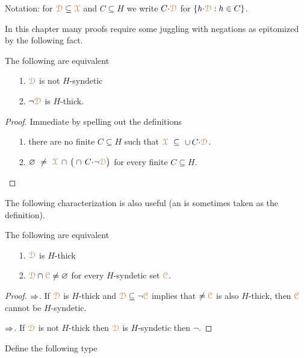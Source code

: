 Notation: for ${\color{brown}\EuScript D}\subseteq{\color{brown}\EuScript X}$ and $C\subseteq H$ we write \emph{$C{\cdot}{\color{brown}\EuScript D}$\/} for $\{h{\cdot}{\color{brown}\EuScript D}: h\in C\}$.

In this chapter many proofs require some juggling with negations as epitomized by the following fact.

\begin{fact}\label{fact_fip}
  The following are equivalent
  \begin{itemize}
    \item[1.] ${\color{brown}\EuScript D}$ is not $H$-syndetic
    \item[2.] $\neg{\color{brown}\EuScript D}$ is $H$-thick.
  \end{itemize}
\end{fact}

\begin{proof}
  Immediate by spelling out the definitions
  \begin{itemize}
    \item[1.] there are no finite $C\subseteq H$ such that ${\color{brown}\EuScript X}\ \subseteq\ \cup\, C{\cdot}{\color{brown}\EuScript D}$.
    \item[2.] $\varnothing\ \neq\ {\color{brown}\EuScript X}\,\cap\,\big(\cap\, C{\cdot}\neg{\color{brown}\EuScript D}\big)$ for every finite $C\subseteq H$.\qedhere
  \end{itemize} 
\end{proof}

The following characterization is also useful (an is sometimes taken as the definition).

\begin{corollary}\label{fact_fip2}
  The following are equivalent
  \begin{itemize}
    \item[1.] ${\color{brown}\EuScript D}$ is $H$-thick
    \item[2.] ${\color{brown}\EuScript D}\cap{\color{brown}\EuScript C}\neq\varnothing$ for every $H$-syndetic set ${\color{brown}\EuScript C}$.
  \end{itemize}
\end{corollary}

\begin{proof}
  $\Rightarrow$. 
  If ${\color{brown}\EuScript D}$ is $H$-thick and ${\color{brown}\EuScript D}\subseteq\neg{\color{brown}\EuScript C}$ implies that $\neq{\color{brown}\EuScript C}$ is also $H$-thick, then ${\color{brown}\EuScript C}$ cannot be $H$-syndetic.

  $\Rightarrow$. 
  If ${\color{brown}\EuScript D}$ is not $H$-thick then ${\color{brown}\EuScript D}$ is $H$-syndetic then $\neg$.
\end{proof}


Define the following type


